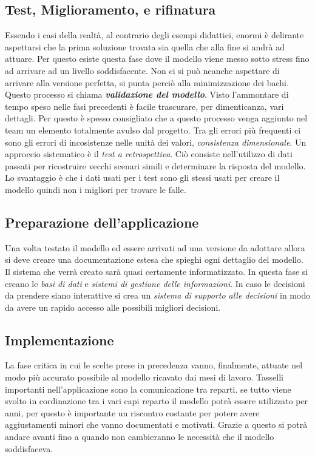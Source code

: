 \documentclass{article}
\begin{document}
\subsection{Test, Miglioramento, e rifinatura}
Essendo i casi della realtà, al contrario degli esempi didattici, enormi è delirante aspettarsi che la prima soluzione trovata sia quella che alla fine si andrà ad attuare. Per questo esiste questa fase dove il modello viene messo sotto stress fino ad arrivare ad un livello soddisfacente. Non ci si può neanche aspettare di arrivare alla versione perfetta, si punta perciò alla minimizzazione dei bachi. Questo processo si chiama \textbf{\textit{validazione del modello}}. Visto l'ammontare di tempo speso nelle fasi precedenti è facile trascurare, per dimenticanza, vari dettagli. Per questo è spesso consigliato che a questo processo venga aggiunto nel team un elemento totalmente avulso dal progetto. Tra gli errori più frequenti ci sono gli errori di incosistenze nelle unità dei valori, \textit{consistenza dimensionale}. Un approccio sistematico è il \textit{test a retrospettiva}. Ciò consiste nell'utilizzo di dati passati per ricostruire vecchi scenari simili e determinare la risposta del modello. Lo svantaggio è che i dati usati per i test sono gli stessi usati per creare il modello quindi non i migliori per trovare le falle.

\subsection{Preparazione dell'applicazione}
Una volta testato il modello ed essere arrivati ad una versione da adottare allora si deve creare una documentazione estesa che spieghi ogni dettaglio del modello. Il sistema che verrà creato sarà quasi certamente informatizzato. In questa fase si creano le \textit{basi di dati} e \textit{sistemi di gestione delle informazioni}. In caso le decisioni da prendere siano interattive si crea un \textit{sistema di supporto alle decisioni} in modo da avere un rapido accesso alle possibili migliori decisioni.

\subsection{Implementazione}
La fase critica in cui le scelte prese in precedenza vanno, finalmente, attuate nel modo più accurato possibile al modello ricavato dai mesi di lavoro. Tasselli importanti nell'applicazione sono la comunicazione tra reparti. se tutto viene svolto in cordinazione tra i vari capi reparto il modello potrà essere utilizzato per anni, per questo è importante un riscontro costante per potere avere aggiustamenti minori che vanno documentati e motivati. Grazie a questo si potrà andare avanti fino a quando non cambieranno le necessità che il modello soddisfaceva.
\end{document}
